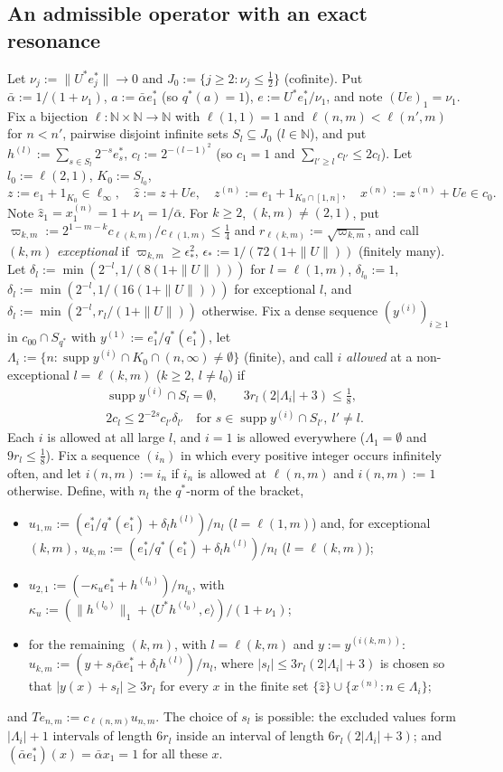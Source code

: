 \documentclass[10pt]{amsart}
\theoremstyle{definition}
\theoremstyle{remark}
\newcommand{\supp}{\operatorname{supp}}
\newcommand{\N}{\mathbb N}
\newcommand{\zh}{\hat z}
\newcommand{\ip}[2]{\langle #1,#2\rangle}
\begin{document}
\subsection{An admissible operator with an exact resonance}
Let $\nu_j:=\|U^*e_j^*\|\to0$ and $J_0:=\{j\ge2:\nu_j\le\frac12\}$
(cofinite).  Put $\bar\alpha:=1/(1+\nu_1)$, $a:=\bar\alpha e_1^*$ (so $q^*(a)=1$),
$e:=U^*e_1^*/\nu_1$, and note $(Ue)_1=\nu_1$.  Fix a bijection
$\ell:\N\times\N\to\N$ with $\ell(1,1)=1$ and $\ell(n,m)<\ell(n',m)$ for $n<n'$, pairwise
disjoint infinite sets $S_l\subseteq J_0$ ($l\in\N$), and put
$h^{(l)}:=\sum_{s\in S_l}2^{-s}e_s^*$, $c_l:=2^{-(l-1)^2}$ (so $c_1=1$ and
$\sum_{l'\ge l}c_{l'}\le2c_l$).  Let $l_0:=\ell(2,1)$, $K_0:=S_{l_0}$,
\[
 z:=e_1+1_{K_0}\in\ell_\infty,\quad \zh:=z+Ue,\quad
 z^{(n)}:=e_1+1_{K_0\cap[1,n]},\quad x^{(n)}:=z^{(n)}+Ue\in c_0 .
\]
Note $\zh_1=x^{(n)}_1=1+\nu_1=1/\bar\alpha$.  For $k\ge2$, $(k,m)\ne(2,1)$, put
$\varpi_{k,m}:=2^{1-m-k}c_{\ell(k,m)}/c_{\ell(1,m)}\le\frac14$ and
$r_{\ell(k,m)}:=\sqrt{\varpi_{k,m}}$, and call $(k,m)$ \emph{exceptional} if
$\varpi_{k,m}\ge\epsilon_*^2$, $\epsilon_*:=1/(72(1+\|U\|))$ (finitely many).
Let $\delta_l:=\min(2^{-l},1/(8(1+\|U\|)))$ for $l=\ell(1,m)$, $\delta_{l_0}:=1$,
$\delta_l:=\min(2^{-l},1/(16(1+\|U\|)))$ for exceptional $l$, and
$\delta_l:=\min(2^{-l},r_l/(1+\|U\|))$ otherwise.  Fix a dense sequence
$(y^{(i)})_{i\ge1}$ in $c_{00}\cap S_{q^*}$ with $y^{(1)}:=e_1^*/q^*(e_1^*)$,
let $\Lambda_i:=\{n:\supp y^{(i)}\cap K_0\cap(n,\infty)\ne\emptyset\}$
(finite), and call $i$ \emph{allowed} at a non-exceptional
$l=\ell(k,m)$ ($k\ge2$, $l\ne l_0$) if
\begin{gather*}
 \supp y^{(i)}\cap S_l=\emptyset,\qquad 3r_l(2|\Lambda_i|+3)\le\tfrac18,\\
 2c_l\le2^{-2s}c_{l'}\delta_{l'}
 \quad\text{for } s\in\supp y^{(i)}\cap S_{l'},\ l'\ne l.
\end{gather*}
Each $i$ is allowed at all large $l$, and $i=1$ is allowed everywhere
($\Lambda_1=\emptyset$ and $9r_l\le\frac18$).  Fix a sequence $(i_n)$ in
which every positive integer occurs infinitely often, and let
$i(n,m):=i_n$ if $i_n$ is allowed at $\ell(n,m)$ and $i(n,m):=1$ otherwise.
Define, with $n_l$ the $q^*$-norm of the bracket,
\begin{itemize}
\item $u_{1,m}:=(e_1^*/q^*(e_1^*)+\delta_lh^{(l)})/n_l$ ($l=\ell(1,m)$) and, for exceptional
$(k,m)$, $u_{k,m}:=(e_1^*/q^*(e_1^*)+\delta_lh^{(l)})/n_l$ ($l=\ell(k,m)$);
\item $u_{2,1}:=(-\kappa_u e_1^*+h^{(l_0)})/n_{l_0}$, with
$\kappa_u:=(\|h^{(l_0)}\|_1+\ip{U^*h^{(l_0)}}{e})/(1+\nu_1)$;
\item for the remaining $(k,m)$, with $l=\ell(k,m)$ and $y:=y^{(i(k,m))}$:
$u_{k,m}:=(y+s_l\bar\alpha e_1^*+\delta_lh^{(l)})/n_l$, where
$|s_l|\le3r_l(2|\Lambda_i|+3)$ is chosen so that $|y(x)+s_l|\ge3r_l$
for every $x$ in the finite set $\{\zh\}\cup\{x^{(n)}:n\in\Lambda_i\}$;
\end{itemize}
and $Te_{n,m}:=c_{\ell(n,m)}u_{n,m}$.  The choice of $s_l$ is possible: the
excluded values form $|\Lambda_i|+1$ intervals of length $6r_l$ inside an
interval of length $6r_l(2|\Lambda_i|+3)$; and $(\bar\alpha
e_1^*)(x)=\bar\alpha x_1=1$ for all these $x$.
\end{document}
